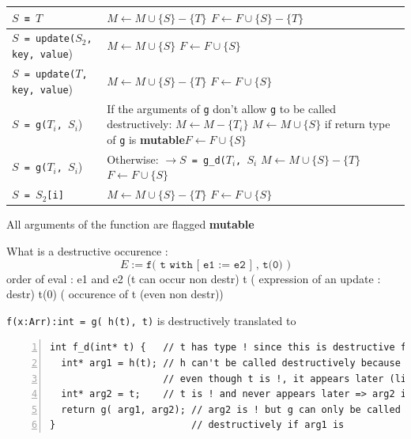 \documentclass[12pt,a4paper,titlepage]{article}
\newcommand{\cl}[1]{\texttt{#1}}
\newcommand{\mut}{\textbf{mutable}}
\begin{document}
\begin{tabular}{|p{60mm}|p{90mm}|}
\hline
\cl{$S$ = $T$} & $M \leftarrow M \cup \{ S \} - \{T\}$ \newline $F \leftarrow F \cup \{ S \} - \{T\}$  \\ \hline
\cl{$S$ = update($S_2$, key, value}) & $M \leftarrow M \cup \{ S \}$ \newline $F \leftarrow F \cup \{ S \}$ \\ \hline
\cl{$S$ = update($T$, key, value}) & $M \leftarrow M \cup \{ S \}  - \{T\}$ \newline $F \leftarrow F \cup \{ S \}$ \\ \hline

\cl{$S$ = g($T_i$, $S_i$}) & If the arguments of \cl{g} don't allow \cl{g} to be called destructively: \newline $M \leftarrow M - \{T_i \}$ \newline $M \leftarrow M \cup \{ S \}$ if return type of \cl{g} is \mut \newline $F \leftarrow F \cup \{ S\}$ \\ \hline

\cl{$S$ = g($T_i$, $S_i$}) & Otherwise: \newline \cl{$\rightarrow S$ = g\_d($T_i$, $S_i$} \newline $M \leftarrow M \cup \{ S \}  - \{T\}$ \newline $F \leftarrow F \cup \{ S \}$ \\ \hline

\cl{$S$ = $S_2$[i]} & $M \leftarrow M \cup \{ S \}  - \{T\}$ \newline $F \leftarrow F \cup \{ S \}$ \\ \hline


\end{tabular}




All arguments of the function are flagged \mut 




What is a destructive occurence :
$$ E :=  \cl{f(  t with [ e1 := e2 ] , t(0) )} $$
order of eval :
e1 and e2  (t can occur non destr)
t          ( expression of an update : destr)
t(0)       ( occurence of t (even non destr))

\cl{f(x:Arr):int = g( h(t), t)}  is destructively translated to \\
\begin{lstlisting}[numbers=left,caption=Example]
int f_d(int* t) {   // t has type ! since this is destructive f
  int* arg1 = h(t); // h can't be called destructively because
                    // even though t is !, it appears later (line 4)
  int* arg2 = t;    // t is ! and never appears later => arg2 is !
  return g( arg1, arg2); // arg2 is ! but g can only be called
}                        // destructively if arg1 is
\end{lstlisting}
\end{document}
